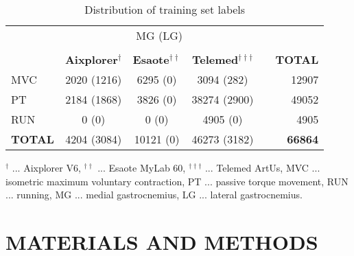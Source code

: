 \documentclass[journal,twoside,web]{ieeecolor}
\begin{document}
 \begin{table}[t]
    \caption{Distribution of training set labels}
    \label{tab:groundtruth}
    \setlength{\tabcolsep}{3pt} \hspace*{-1.3cm} 
    \begin{center}
    \begin{tabular}{lccc c r}
\toprule
        &
        \multicolumn{3}{c}{MG (LG)}
        &
        &
        \\
        \cline{2-4}\\
&\textbf{Aixplorer$^{\dagger}$} 
        &\textbf{Esaote$^{\dagger\dagger}$}
        &\textbf{Telemed$^{\dagger\dagger\dagger}$}
        &
        &\textbf{TOTAL}\\ 
\midrule
        \rule{0pt}{12pt}MVC
        &2020 (1216)
        &6295 (0)
        &3094 (282)
        &
        &12907\\
\rule{0pt}{12pt}PT
        &2184 (1868)
        &3826 (0)
        &38274 (2900)
        &
        &49052\\
\rule{0pt}{12pt}RUN
        &0 (0)
        &0 (0)
        &4905 (0)
        &
        &4905\\
\bottomrule
        \rule{0pt}{12pt}\textbf{TOTAL} 
        &4204 (3084)
        &10121 (0)
        &46273 (3182)
        &
        &\textbf{66864}\\
    \end{tabular}
    \end{center}
        \begin{tablenotes}
        \item $^{\dagger}$ ... Aixplorer V6, $^{\dagger\dagger}$ ... Esaote MyLab 60, $^{\dagger\dagger\dagger}$ ... Telemed ArtUs, MVC ... isometric maximum voluntary contraction, PT ... passive torque movement, RUN ... running, MG ... medial gastrocnemius, LG ... lateral gastrocnemius.\\
    \end{tablenotes}
    \vspace{-0.5cm}
\end{table} 
\section{MATERIALS AND METHODS}
\label{sec:methods}
\end{document}
